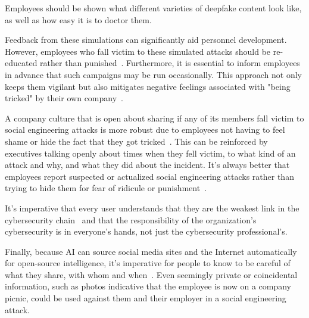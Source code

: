 Employees should be shown what different varieties of deepfake content look like, as well as how easy it is to doctor them.

Feedback from these simulations can significantly aid personnel development. However, employees who fall victim to these simulated attacks should be re-educated rather than punished~\citep{mitnick_The_Art_of_Deception_2003}. Furthermore, it is essential to inform employees in advance that such campaigns may be run occasionally. This approach not only keeps them vigilant but also mitigates negative feelings associated with "being tricked" by their own company~\citep{hadnagy_Social_Engineering_The_Science_2018}.

A company culture that is open about sharing if any of its members fall victim to social engineering attacks is more robust due to employees not having to feel shame or hide the fact that they got tricked~\citep{hadnagy_Social_Engineering_The_Science_2018}. This can be reinforced by executives talking openly about times when they fell victim, to what kind of an attack and why, and what they did about the incident. It's always better that employees report suspected or actualized social engineering attacks rather than trying to hide them for fear of ridicule or punishment~\citep{mitnick_The_Art_of_Deception_2003}.

It's imperative that every user understands that they are the weakest link in the cybersecurity chain~\citep{mitnick_The_Art_of_Deception_2003} and that the responsibility of the organization's cybersecurity is in everyone's hands, not just the cybersecurity professional's.

Finally, because AI can source social media sites and the Internet automatically for open-source intelligence, it's imperative for people to know to be careful of what they share, with whom and when~\citep{mitnick_The_Art_of_Deception_2003}. Even seemingly private or coincidental information, such as photos indicative that the employee is now on a company picnic, could be used against them and their employer in a social engineering attack.